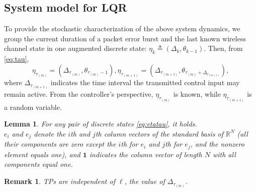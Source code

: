 \documentclass[journal,twoside,web]{ieeecolor}
\newtheorem{remark}{Remark}
\newtheorem{lemma}{Lemma}
\begin{document}
\subsection{System model for LQR}
To provide the stochastic characterization of the above system dynamics, we group the current duration of a packet error burst and the last known wireless channel state in one augmented discrete state:
$\eta_{k}^{} \!\triangleq\! (\mathit{\Delta}_{k},\theta_{k-1})$. Then, from \eqref{eq:tau},
\begin{subequations}\label{eq:etatau}
\begin{equation}
    \eta_{\tau_{(m)}}^{} = (\mathit{\Delta}_{\tau_{(m)}},\theta_{\tau_{(m)}-1}),
\end{equation}
\begin{equation}
    \eta_{\tau_{(m+1)}}^{} = (\mathit{\Delta}_{\tau_{(m+1)}},\theta_{\tau_{(m)}+\mathit{\Delta}_{\tau_{(m+1)}}}),
\end{equation}
\end{subequations}
where $\mathit{\Delta}_{\tau_{(m+1)}}$ indicates the time interval the transmitted control input may remain active. From the controller's perspective, $\eta_{\tau_{(m)}}^{}$ is known, while $\eta_{\tau_{(m+1)}}^{}$ is a random variable.
\begin{lemma}\label{lemma:z}
For any pair of discrete states \eqref{eq:etatau}, it holds.\\
$e_i$ and $e_j$ denote the $i$th and $j$th column vectors of the standard basis of $\mathbb{R}^{N}$ (all their components are zero except the $i$th for $e_i$ and $j$th for $e_j$, and the nonzero element equals one), and $\mathbf{1}$ indicates the column vector of length $N$ with all components equal one.
\end{lemma}
\begin{remark}\label{rem:1}
TPs are independent of $\ell$, the value of $\mathit{\Delta}_{\tau_{(m)}}$.
\end{remark}





\end{document}
